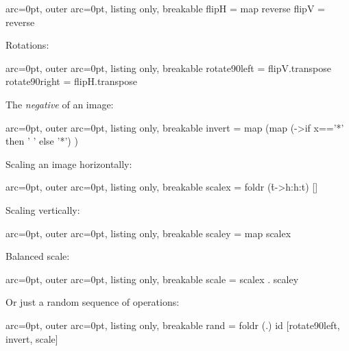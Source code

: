 \begin{tcblisting}{ arc=0pt, outer arc=0pt, listing only, breakable}
flipH = map reverse
flipV = reverse

\end{tcblisting}


Rotations:

\begin{tcblisting}{ arc=0pt, outer arc=0pt, listing only, breakable}
rotate90left = flipV.transpose
rotate90right = flipH.transpose

\end{tcblisting}


The \textit{negative} of an image:

\begin{tcblisting}{ arc=0pt, outer arc=0pt, listing only, breakable}
invert = map (map (\x->if x=='*' then ' ' else '*') )

\end{tcblisting}


Scaling an image horizontally:

\begin{tcblisting}{ arc=0pt, outer arc=0pt, listing only, breakable}
scalex = foldr (\h t->h:h:t) []    

\end{tcblisting}


Scaling vertically:

\begin{tcblisting}{ arc=0pt, outer arc=0pt, listing only, breakable}
scaley = map scalex

\end{tcblisting}


Balanced scale:

\begin{tcblisting}{ arc=0pt, outer arc=0pt, listing only, breakable}
scale = scalex . scaley

\end{tcblisting}


Or just a random sequence of operations:

\begin{tcblisting}{ arc=0pt, outer arc=0pt, listing only, breakable}
rand = foldr (.) id [rotate90left, invert, scale]

\end{tcblisting}
